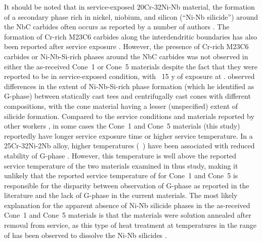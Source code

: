 {It should be noted that in service-exposed 20Cr-32Ni-Nb material, the formation of a secondary phase rich in nickel, niobium, and silicon (``Ni-Nb silicide'') around the NbC carbides often occurs as reported by a number of authors \cite{shi_microstructure_2008,hoffman_high_2000-1,knowles_service_2004,patchett_welding_1998}. The formation of Cr-rich M23C6 carbides along the interdendritic boundaries has also been reported after service exposure \cite{shi_microstructure_2008,patchett_welding_1998}. However, the presence of Cr-rich M23C6 carbides or Ni-Nb-Si-rich phases around the NbC carbides was not observed in either the as-received Cone~1 or Cone~5 materials despite the fact that they were reported to be in service-exposed condition, with ~15 y of exposure at . \citet{hoffman_high_2000-1} observed differences in the extent of Ni-Nb-Si-rich phase formation (which he identified as G-phase) between statically cast tees and centrifugally cast cones with different compositions, with the cone material having a lesser (unspecified) extent of silicide formation. Compared to the service conditions and materials reported by other workers \cite{hoffman_high_2000-1,patchett_welding_1998,knowles_service_2004,shi_microstructure_2008}, in some cases the Cone~1 and Cone~5 materials (this study) reportedly have longer service exposure time or higher service temperature. In a 25Cr-32Ni-2Nb alloy, higher temperatures (~) have been associated with reduced stability of G-phase \cite{de_almeida_soares_niobium_1992-1}. However, this temperature is well above the reported service temperature of the two materials examined in thus study, making it unlikely that the reported service temperature of  for Cone~1 and Cone~5 is responsible for the disparity between observation of G-phase as reported in the literature and the lack of G-phase in the current materials. The most likely explanation for the apparent absence of Ni-Nb silicide phases in the as-received Cone~1 and Cone~5 materials is that the materials were solution annealed after removal from service, as this type of heat treatment at temperatures in the range of  has been observed to dissolve the Ni-Nb silicides \cite{hoffman_high_2000-1,dewar_correlation_2013}.



}
